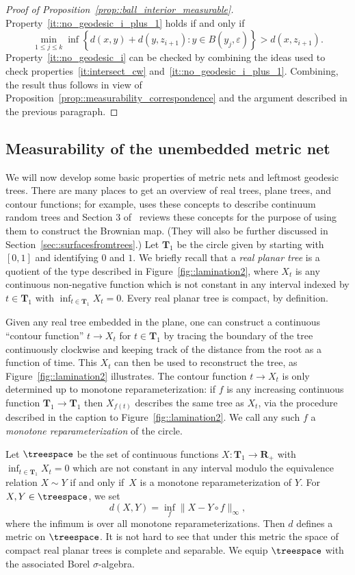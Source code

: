 \documentclass[10pt]{amsart}
\let\epsilon\varepsilon
\theoremstyle{plain}
\numberwithin{theorem}{section}
\theoremstyle{definition}
\newcommand{\R}{\mathbf{R}}
\newcommand{\T}{\mathbf{T}}
\begin{document}
\begin{proof}[Proof of Proposition~\ref{prop::ball_interior_measurable}]
Property~\ref{it::no_geodesic_i_plus_1} holds if and only if
\[
\min_{1 \leq j \leq k} \inf \left\{ d(x,y) + d(y,z_{i+1}) : y \in B(y_j,\epsilon) \right\} > d(x,z_{i+1}).
\]
Property~\ref{it::no_geodesic_i} can be checked by combining the ideas used to check properties~\ref{it:intersect_cw} and~\ref{it::no_geodesic_i_plus_1}. Combining, the result thus follows in view of Proposition~\ref{prop::measurability_correspondence} and the argument described in the previous paragraph.
\end{proof}

\subsection{Measurability of the unembedded metric net}
\label{subsec:unembedded_measurability}

We will now develop some basic properties of metric nets and leftmost geodesic trees. There are many places to get an overview of real trees, plane trees, and contour functions; for example, \cite{ald1991crt1,ald1991crt2,ald1993crt3} uses these concepts to describe continuum random trees and Section 3 of~\cite{le2012scaling} reviews these concepts for the purpose of using them to construct the Brownian map. (They will also be further discussed in Section~\ref{sec::surfacesfromtrees}.) Let $\T_1$ be the circle given by starting with $[0,1]$ and identifying $0$ and $1$. We briefly recall that a \emph{real planar tree} is a quotient of the type described in Figure~\ref{fig::lamination2}, where $X_t$ is any continuous non-negative function which is not constant in any interval indexed by $t \in \T_1$ with $\inf_{t \in \T_1} X_t = 0$. Every real planar tree is compact, by definition.

Given any real tree embedded in the plane, one can construct a continuous ``contour function'' $t \to X_t$ for $t \in \T_1$ by tracing the boundary of the tree continuously clockwise and keeping track of the distance from the root as a function of time. This $X_t$ can then be used to reconstruct the tree, as Figure~\ref{fig::lamination2} illustrates. The contour function $t \to X_t$ is only determined up to monotone reparameterization: if $f$ is any increasing continuous function $\T_1 \to \T_1$ then $X_{f(t)}$ describes the same tree as $X_t$, via the procedure described in the caption to Figure~\ref{fig::lamination2}. We call any such $f$ a \emph{monotone reparameterization} of the circle.

Let $\treespace$ be the set of continuous functions $X \colon \T_1 \to \R_+$ with $\inf_{t \in \T_1} X_t = 0$ which are not constant in any interval modulo the equivalence relation $X \sim Y$ if and only if~$X$ is a monotone reparameterization of $Y$. For $X,Y \in \treespace$, we set
\[
d(X,Y) = \inf_{f} \|X - Y \circ f\|_\infty,
\]
where the infimum is over all monotone reparameterizations. Then $d$ defines a metric on $\treespace$. It is not hard to see that under this metric the space of compact real planar trees is complete and separable. We equip $\treespace$ with the associated Borel $\sigma$-algebra.
\end{document}
